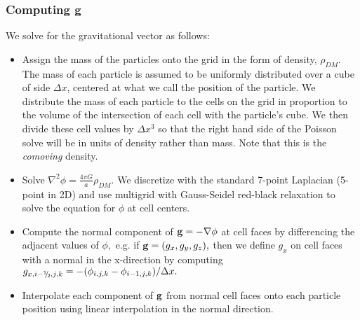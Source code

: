 \subsubsection{Computing {\bf g}}

We solve for the gravitational vector as follows:
\begin{itemize}
\item Assign the mass of the particles onto the grid in the form of density, $\rho_{DM}$.  
The mass of each particle is assumed to be uniformly distributed over a cube of side $\Delta x$, 
centered at what we call the position of the particle.    We distribute the mass of each
particle to the cells on the grid in proportion to the volume of the intersection of each cell
with the particle's cube.   We then divide these cell values by $\Delta x^3$ so that the
right hand side of the Poisson solve will be in units of density rather than mass.  
Note that this is the {\it comoving} density.

\item Solve $\nabla^2 \phi = \frac{4 \pi G}{a} \rho_{DM}$.
We discretize with the standard 7-point Laplacian (5-point in 2D) 
and use multigrid with Gauss-Seidel red-black relaxation to solve the equation for $\phi$ at cell centers.

\item Compute the normal component of ${\bf g} = -\nabla \phi$ at cell faces by differencing the adjacent values of $\phi,$
e.g. if ${\bf g} = (g_x, g_y, g_z),$ then we define $g_x$ on cell faces with a normal in the x-direction by computing
$g_{x,i-\myhalf,j,k} = -(\phi_{i,j,k} - \phi_{i-1,j,k}) / \Delta x.$

\item  Interpolate each component of ${\bf g}$ from normal cell faces onto each particle position using 
linear interpolation in the normal direction.

\end{itemize}


